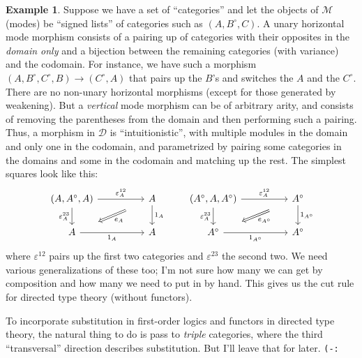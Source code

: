 \documentclass{article}
\theoremstyle{definition}
\newtheorem{eg}{Example}
\def\M{\mathcal{M}}
\def\D{\mathcal{D}}
\def\o{^{\circ}}
\begin{document}
\begin{eg}
  Suppose we have a set of ``categories'' and let the objects of $\M$ (modes) be ``signed lists'' of categories such as $(A,B\o,C)$.
  A unary horizontal mode morphism consists of a pairing up of categories with their opposites in the \emph{domain only} and a bijection between the remaining categories (with variance) and the codomain.
  For instance, we have such a morphism $(A,B\o,C\o,B) \to (C\o,A)$ that pairs up the $B$'s and switches the $A$ and the $C\o$.
  There are no non-unary horizontal morphisms (except for those generated by weakening).
  But a \emph{vertical} mode morphism can be of arbitrary arity, and consists of removing the parentheses from the domain and then performing such a pairing.
  Thus, a morphism in $\D$ is ``intuitionistic'', with multiple modules in the domain and only one in the codomain, and parametrized by pairing some categories in the domains and some in the codomain and matching up the rest.
  The simplest squares look like this:
  \[\begin{tikzcd}[column sep=huge]
    (A,A\o,A) \ar[r,"\varepsilon^{12}_A"] \ar[d,swap,"\varepsilon^{23}_A"]
    \ar[from=r,to=d,phantom,""{name=1,near start},""{name=2,near end}]
    \ar[Rightarrow,from=1,to=2,"e_A"]
    & A \ar[d,"1_A"]
    \\ A \ar[r,swap,"1_A"] & A
  \end{tikzcd}
  \qquad
  \begin{tikzcd}[column sep=huge]
    (A\o,A,A\o) \ar[r,"\varepsilon^{12}_A"] \ar[d,swap,"\varepsilon^{23}_A"]
    \ar[from=r,to=d,phantom,""{name=1,near start},""{name=2,near end}]
    \ar[Rightarrow,from=1,to=2,"{e_{A\o}}"]
    & A\o \ar[d,"1_{A\o}"]
    \\ A\o \ar[r,swap,"1_{A\o}"] & A\o
  \end{tikzcd}\]
  where $\varepsilon^{12}$ pairs up the first two categories and $\varepsilon^{23}$ the second two.
  We need various generalizations of these too; I'm not sure how many we can get by composition and how many we need to put in by hand.
  This gives us the cut rule for directed type theory (without functors).
\end{eg}

To incorporate substitution in first-order logics and functors in directed type theory, the natural thing to do is pass to \emph{triple} categories, where the third ``transversal'' direction describes substitution.
But I'll leave that for later.  \texttt{(-:}
\end{document}

